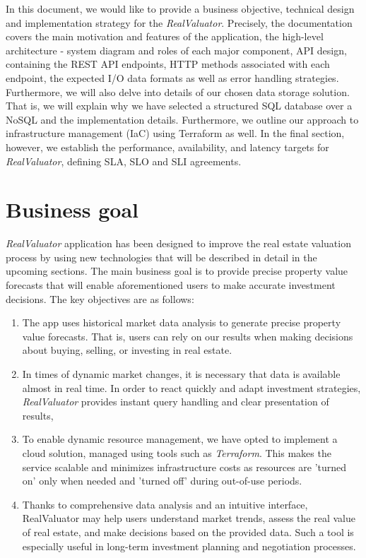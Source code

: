 \documentclass{article}
\begin{document}
 In this document, we would like to provide a business objective, technical design and implementation strategy for the \textit{RealValuator}. Precisely, the documentation covers the main motivation and features of the application, the high-level architecture - system diagram and roles of each major component, API design, containing the REST API endpoints, HTTP methods associated with each endpoint, the expected I/O data formats as well as error handling strategies. Furthermore, we will also delve into details of our chosen data storage solution. That is, we will explain why we have selected a structured SQL database over a NoSQL and the implementation details. Furthermore, we outline our approach to infrastructure management (IaC) using Terraform as well. In the final section, however, we establish the performance, availability, and latency targets for \textit{RealValuator}, defining SLA, SLO and SLI agreements. 


\section{Business goal}

\textit{RealValuator} application has been designed to improve the real estate valuation process by using new technologies that will be described in detail in the upcoming sections. The main business goal is to provide precise property value forecasts that will enable aforementioned users to make accurate investment decisions. The key objectives are as follows:

\begin{enumerate}
    \item The app uses historical market data analysis to generate precise property value forecasts. That is, users can rely on our results when making decisions about buying, selling, or investing in real estate.

    \item In times of dynamic market changes, it is necessary that data is available almost in real time. In order to react quickly and adapt investment strategies, \textit{RealValuator} provides instant query handling and clear presentation of results,

    \item To enable dynamic resource management, we have opted to implement a cloud solution, managed using tools such as \textit{Terraform}. This makes the service scalable and minimizes infrastructure costs as resources are 'turned on' only when needed and 'turned off' during out-of-use periods.

    \item Thanks to comprehensive data analysis and an intuitive interface, RealValuator may help users understand market trends, assess the real value of real estate, and make decisions based on the provided data. Such a tool is especially useful in long-term investment planning and negotiation processes.
\end{enumerate}
\end{document}
